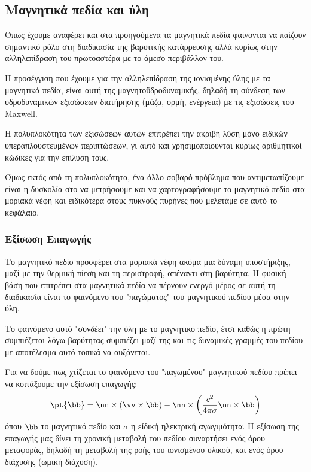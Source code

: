 \subsection{Μαγνητικά πεδία και ύλη}
\label{par:frozenmagneticfield} 

Όπως έχουμε αναφέρει και στα προηγούμενα τα μαγνητικά πεδία φαίνονται να παίζουν σημαντικό ρόλο στη διαδικασία της βαρυτικής κατάρρευσης αλλά κυρίως στην αλληλεπίδραση του πρωτοαστέρα με το άμεσο περιβάλλον του.


Η προσέγγιση που έχουμε για την αλληλεπίδραση της ιονισμένης ύλης με τα μαγνητικά πεδία, είναι αυτή της μαγνητοϋδροδυναμικής, δηλαδή τη σύνδεση των υδροδυναμικών εξισώσεων διατήρησης (μάζα, ορμή, ενέργεια) με τις εξισώσεις του Maxwell.  


Η πολυπλοκότητα των εξισώσεων αυτών επιτρέπει την ακριβή λύση μόνο ειδικών υπεραπλουστευμένων περιπτώσεων, γι αυτό και χρησιμοποιούνται κυρίως αριθμητικοί κώδικες για την επίλυση τους.


Όμως εκτός από τη πολυπλοκότητα, ένα άλλο σοβαρό πρόβλημα που αντιμετωπίζουμε είναι η δυσκολία στο να μετρήσουμε και να χαρτογραφήσουμε το μαγνητικό πεδίο στα μοριακά νέφη και ειδικότερα στους πυκνούς πυρήνες που μελετάμε σε αυτό το κεφάλαιο.  


\subsubsection{Εξίσωση Επαγωγής}
Το μαγνητικό πεδίο προσφέρει στα μοριακά νέφη ακόμα μια δύναμη υποστήριξης, μαζί με την θερμική πίεση και τη περιστροφή, απέναντι στη βαρύτητα. Η φυσική βάση που επιτρέπει στα μαγνητικά πεδία να πέρνουν ενεργό μέρος σε αυτή τη διαδικασία είναι το φαινόμενο του "παγώματος" του μαγνητικού πεδίου μέσα στην ύλη.


Το φαινόμενο αυτό "συνδέει" την ύλη με το μαγνητικό πεδίο, έτσι καθώς η πρώτη συμπιέζεται λόγω βαρύτητας συμπιέζει μαζί της και τις δυναμικές γραμμές του πεδίου με αποτέλεσμα αυτό τοπικά να αυξάνεται.


Για να δούμε πως χτίζεται το φαινόμενο του "παγωμένου" μαγνητικού πεδίου πρέπει να κοιτάξουμε την εξίσωση επαγωγής:
\begin{equation}
\pt{\bb} = \nn \times (\vv \times \bb) -\nn \times \left( \frac{c^2}{4 \pi \sigma} \nn \times \bb \right) 
\end{equation}
όπου  $\bb$ το μαγνητικό πεδίο και $\sigma$ η είδική ηλεκτρική αγωγιμότητα.
Η εξίσωση της επαγωγής μας δίνει τη χρονική μεταβολή του πεδίου συναρτήσει ενός όρου μεταφοράς, δηλαδή τη μεταβολή της ροής του ιονισμένου υλικού, και ενός όρου διάχυσης (ωμική διάχυση).


